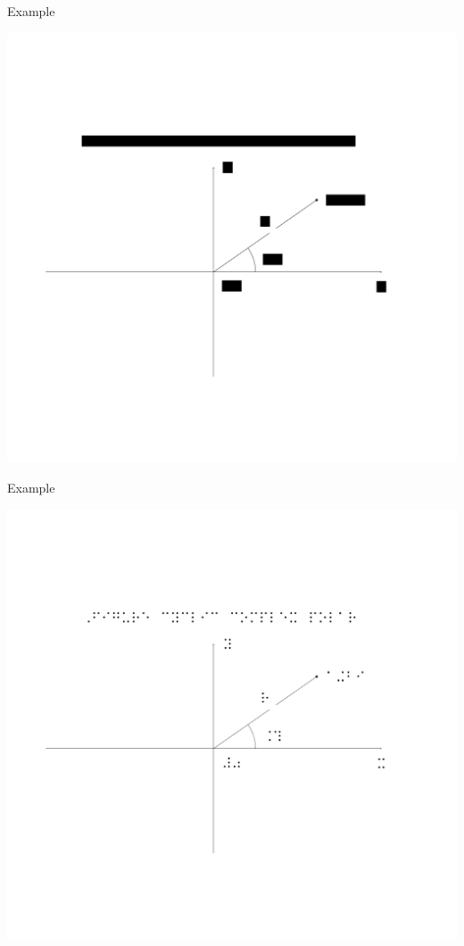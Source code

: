 \begin{frame}{Example}

\centering
\includegraphics{cyclic-complex-polar_svg.pdf}
\end{frame}


\begin{frame}{Example}

\centering
\includegraphics{cyclic-complex-polar.pdf}
\end{frame}


